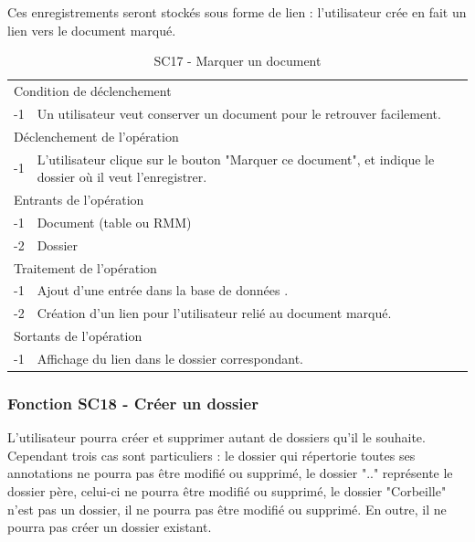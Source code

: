 \documentclass[a4paper]{article}
\begin{document}
Ces enregistrements seront stockés sous forme de lien : l'utilisateur crée en fait un lien vers le document marqué.\\

\begin{table}[H]
  \centering
   \small
	\begin{tabular}{|c|p{12cm}|}
   		\hline
   			\rowcolor{lightgray}\multicolumn{2}{|c|}{\textbf{SC17 - Marquer un document}} \\
   		\hline
   			\multicolumn{2}{|l|}{Condition de d\'eclenchement} \\
   		\hline
   		-1 & Un utilisateur veut conserver un document pour le retrouver facilement. \\
   		\hline
   			\multicolumn{2}{|l|}{D\'eclenchement de l'op\'eration} \\
   		\hline
   			-1 & L'utilisateur clique sur le bouton "Marquer ce document", et indique le dossier où il veut l'enregistrer. \\
   		\hline
   			\multicolumn{2}{|l|}{Entrants de l'op\'eration} \\
   		\hline
   			-1 & Document (table ou RMM)\\
        		-2 & Dossier\\
   		\hline
   			\multicolumn{2}{|l|}{Traitement de l'op\'eration} \\
  		\hline
   			-1 & Ajout d'une entr\'ee dans la base de donn\'ees .\\
			-2 & Création d'un lien pour l'utilisateur relié au document marqué.\\
   		\hline
   			\multicolumn{2}{|l|}{Sortants de l'op\'eration} \\
   		\hline
   			-1 & Affichage du lien dans le dossier correspondant. \\
   		\hline
	\end{tabular}
  \caption{SC17 - Marquer un document}
  \normalsize
  \label{tab:marquer_document}
\end{table}

\subsubsection{Fonction SC18 - Créer un dossier}
L'utilisateur pourra créer et supprimer autant de dossiers qu'il le souhaite. Cependant trois cas sont particuliers : le dossier qui répertorie toutes ses annotations ne pourra pas être modifié ou supprimé, le dossier ".." représente le dossier père, celui-ci ne pourra être modifié ou supprimé, le dossier "Corbeille" n'est pas un dossier, il ne pourra pas être modifié ou supprimé. En outre, il ne pourra pas créer un dossier existant.
\end{document}
